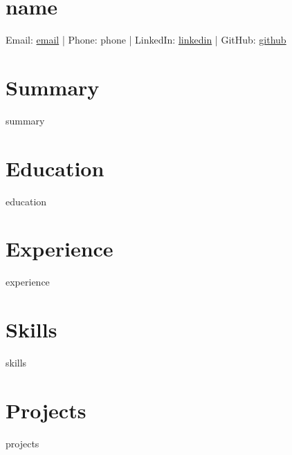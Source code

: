 \documentclass[11pt]{article}
\begin{document}
\section*{\Huge {{name}}}

\noindent
Email: \href{mailto:{{email}}}{{{{email}}}} | 
Phone: {{phone}} | 
LinkedIn: \href{{{{linkedin}}}}{{{{linkedin}}}} | 
GitHub: \href{{{{github}}}}{{{{github}}}}

\section*{Summary}
{{summary}}

\section*{Education}
\begin{itemize}[leftmargin=*]
{{education}}
\end{itemize}

\section*{Experience}
\begin{itemize}[leftmargin=*]
{{experience}}
\end{itemize}

\section*{Skills}
{{skills}}

\section*{Projects}
\begin{itemize}[leftmargin=*]
{{projects}}
\end{itemize}
\end{document}

